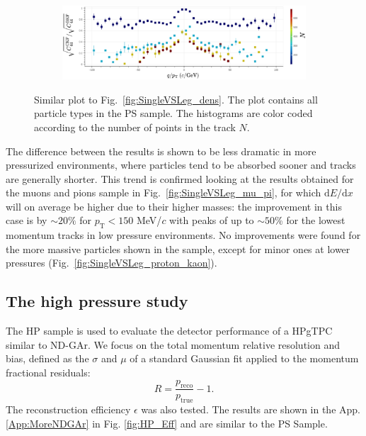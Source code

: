 \begin{figure}[!ht]
     \centering
     \begin{subfigure}[h!]{0.99\textwidth}
         \centering
         \includegraphics[width=\textwidth]{figures/ch5-KF_NDGAr/ToySample/ParScan/TotVSLegVSNPoints_label.eps}
         \caption{}
         \label{fig:SingleVSLeg_NPoints}
     \end{subfigure}
        \caption[Similar plot to Fig.~\ref{fig:SingleVSLeg_dens}. The plot contains all particle types in the PS sample. The histograms are color coded according to the number of points in the track $N$.]{Similar plot to Fig.~\ref{fig:SingleVSLeg_dens}. The plot contains all particle types in the PS sample. The histograms are color coded according to the number of points in the track $N$.}
        \label{fig:SingleVSLeg_NPointsAll}
\end{figure}

The difference between the results is shown to be less dramatic in more pressurized environments, where particles tend to be absorbed sooner and tracks are generally shorter. This trend is confirmed looking at the results obtained for the muons and pions sample in Fig.~\ref{fig:SingleVSLeg_mu_pi}, for which $\textrm{d}E/\textrm{d}x$ will on average be higher due to their higher masses: the improvement in this case is by $\sim 20\%$ for $p_{\text{T}}<150$ MeV/$c$ with peaks of up to $\sim50$\% for the lowest momentum tracks in low pressure environments. No improvements were found for the more massive particles shown in the sample, except for minor ones at lower pressures (Fig.~\ref{fig:SingleVSLeg_proton_kaon}).


\subsection{The high pressure study}
\label{Sec:HPSample}
The HP sample is used to evaluate the detector performance of a HPgTPC similar to ND-GAr. We focus on the total momentum relative resolution and bias, defined as the $\sigma$ and $\mu$ of a standard Gaussian fit applied to the momentum fractional residuals:
\begin{equation}
    R = \frac{p_{\text{reco}}}{p_{\text{true}}} - 1.
\end{equation}
The reconstruction efficiency $\epsilon$ was also tested. The results are shown in the App. \ref{App:MoreNDGAr} in Fig. \ref{fig:HP_Eff} and are similar to the PS Sample.


